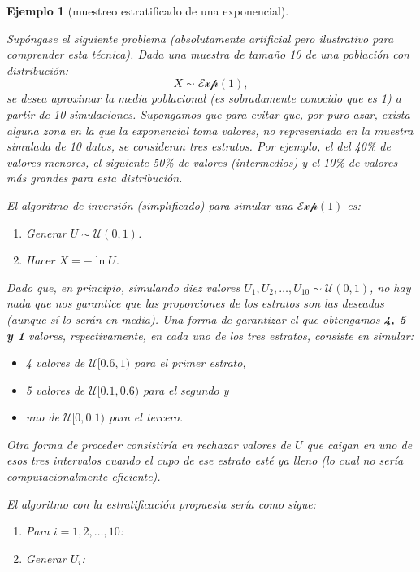 \documentclass[
  10pt,
]{book}
\theoremstyle{break}
\newtheorem{example}{Ejemplo}[chapter]
\theoremstyle{nonumberplain}
\begin{document}
\begin{example}[muestreo estratificado de una exponencial]
\protect\hypertarget{exm:estr-exp}{}\label{exm:estr-exp}

Supóngase el siguiente problema (absolutamente artificial pero ilustrativo para comprender esta técnica).
Dada una muestra de tamaño 10 de una población con distribución:
\[X \sim \mathcal{Exp}\left( 1 \right),\]
se desea aproximar la media poblacional (es sobradamente conocido que es 1) a partir de 10 simulaciones.
Supongamos que para evitar que, por puro azar, exista alguna zona en la que la exponencial toma valores, no representada en la muestra simulada de 10 datos, se consideran tres estratos.
Por ejemplo, el del 40\% de valores menores, el siguiente 50\% de valores (intermedios) y el 10\% de valores más grandes para esta distribución.

El algoritmo de inversión (simplificado) para simular una \(\mathcal{Exp}\left(1\right)\) es:

\begin{enumerate}
\def\labelenumi{\arabic{enumi}.}
\item
  Generar \(U\sim \mathcal{U}\left( 0,1\right)\).
\item
  Hacer \(X=-\ln U\).
\end{enumerate}

Dado que, en principio, simulando diez valores \(U_{1},U_{2},\ldots,U_{10}\sim \mathcal{U}\left( 0,1\right)\), no hay nada que nos garantice que las proporciones de los estratos son las deseadas (aunque sí lo serán en media).
Una forma de garantizar el que obtengamos \textbf{4, 5 y 1} valores, repectivamente, en cada uno de los tres estratos, consiste en simular:

\begin{itemize}
\item
  4 valores de \(\mathcal{U}[0.6,1)\) para el primer estrato,
\item
  5 valores de \(\mathcal{U}[0.1,0.6)\) para el segundo y
\item
  uno de \(\mathcal{U}[0,0.1)\) para el tercero.
\end{itemize}

Otra forma de proceder consistiría en rechazar valores de \(U\) que caigan en uno de esos tres intervalos cuando el cupo de ese estrato esté ya lleno (lo cual no sería computacionalmente eficiente).

El algoritmo con la estratificación propuesta sería como sigue:

\begin{enumerate}
\def\labelenumi{\arabic{enumi}.}
\item
  Para \(i=1,2,\ldots, 10\):
\item
  Generar \(U_{i}\):


\end{enumerate}
\end{example}
\end{document}
